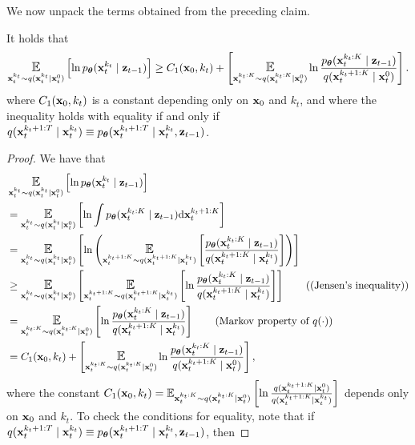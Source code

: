 We now unpack the terms obtained from the preceding claim.
\begin{claim}[ELBO w.r.t. $q$]  It holds that
\begin{align*}
\Exp_{\bx_t^{k_t} \sim q(\bx_t^{k_t} \mid \bx_t^0)}\left[\ln \ptheta(\bx_{t}^{k_t} \mid \bz_{t-1})\right] \ge C_1(\bx_0,k_t) + \left[\Exp_{\bx_t^{k_t:K} \sim q(\bx_t^{k_t:K} \mid \bx_t^0)}  \ln\frac{\ptheta(\bx_{t}^{k_t:K} \mid \bz_{t-1})}{q(\bx_t^{k_t+1:K} \mid \bx_t^{0})}\right].
\end{align*}
where $ C_1(\mathbf{x}_0,k_t) $ is a constant depending only on $\mathbf{x}_0$ and $k_t$, and where the inequality holds with equality if and only if $q(\mathbf{x}_{t}^{k_t+1:T} \mid \mathbf{x}_t^{k_t}) \equiv p_{\bm{\theta}}(\mathbf{x}_{t}^{k_t+1:T} \mid \mathbf{x}_t^{k_t},\mathbf{z}_{t-1})$. 
\end{claim}
\begin{proof}
We have that 
\begin{align*}
&\Exp_{\bx_t^{k_t} \sim q(\bx_t^{k_t} \mid \bx_t^0)}\left[\ln \ptheta(\bx_{t}^{k_t} \mid \bz_{t-1})\right]\\
 &= \Exp_{\bx_t^{k_t} \sim q(\bx_t^{k_t} \mid \bx_t^0)} \left[\ln \int  \ptheta(\bx_{t}^{k_t:K} \mid \bz_{t-1})\rmd \bx_{t}^{k_t+1:K}\right]\\
&= \Exp_{\bx_t^{k_t} \sim q(\bx_t^{k_t} \mid \bx_t^0)}\left[\ln\left(\Exp_{\bx_t^{k_t+1:K} \sim q(\bx_t^{k_t+1:K} \mid \bx_t^{k_t})}  \left[\frac{\ptheta(\bx_{t}^{k_t:K} \mid \bz_{t-1})}{q(\bx_t^{k_t+1:K} \mid \bx_t^{k_t})}\right]\right)\right] \\
&\ge \Exp_{\bx_t^{k_t} \sim q(\bx_t^{k_t} \mid \bx_t^0)}\left[\Exp_{\bx_t^{k_t+1:K} \sim q(\bx_t^{k_t+1:K} \mid \bx_t^{k_t})}\left[  \ln\frac{\ptheta(\bx_{t}^{k_t:K} \mid \bz_{t-1})}{q(\bx_t^{k_t+1:K} \mid \bx_t^{k_t})}\right]\right] \tag{(Jensen's inequality)}\\
&= \Exp_{\bx_t^{k_t:K} \sim q(\bx_t^{k_t:K} \mid \bx_t^0)}  \left[\ln\frac{\ptheta(\bx_{t}^{k_t:K} \mid \bz_{t-1})}{q(\bx_t^{k_t+1:K} \mid \bx_t^{k_t})}\right] \tag{Markov property of $q(\cdot)$} \\
&= C_1(\bx_0,k_t) + \left[\Exp_{\bx_t^{k_t:K} \sim q(\bx_t^{k_t:K} \mid \bx_t^0)}  \ln\frac{\ptheta(\bx_{t}^{k_t:K} \mid \bz_{t-1})}{q(\bx_t^{k_t+1:K} \mid \bx_t^{0})}\right],
\end{align*}
where the constant $ C_1(\bx_0,k_t) = \Exp_{\bx_t^{k_t:K} \sim q(\bx_t^{k_t:K} \mid \bx_t^0)}\left[ \ln\frac{q(\bx_t^{k_t+1:K} \mid \bx_t^{0})}{q(\bx_t^{k_t+1:K} \mid \bx_t^{k_t})}\right]$ depends only on $\mathbf{x}_0$ and $k_t$. To check the conditions for equality, note that if $q(\mathbf{x}_{t}^{k_t+1:T} \mid \mathbf{x}_t^{k_t}) \equiv p_{\bm{\theta}}(\mathbf{x}_{t}^{k_t+1:T} \mid \mathbf{x}_t^{k_t},\mathbf{z}_{t-1})$, then 

\end{proof}
